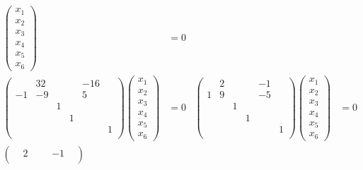 \documentclass[12pt,a4paper]{article}
\begin{document}
\begin{problem*}
\begin{enumerate}
\begin{align*}
                    \begin{pmatrix}
                        x_1\\x_2\\x_3\\x_4\\x_5\\x_6
                    \end{pmatrix}
                    &= 0\\
                    \begin{pmatrix}
                        & 32& & & -16& \\
                        -1& -9& & & 5& \\
                        & & 1& & & \\
                        & & & 1& & \\
                        & & & & & 1\\
                    \end{pmatrix}
                    \begin{pmatrix}
                        x_1\\x_2\\x_3\\x_4\\x_5\\x_6
                    \end{pmatrix}
                    &= 0&
                    \begin{pmatrix}
                        & 2& & & -1& \\
                        1& 9& & & -5& \\
                        & & 1& & & \\
                        & & & 1& & \\
                        & & & & & 1\\
                    \end{pmatrix}
                    \begin{pmatrix}
                        x_1\\x_2\\x_3\\x_4\\x_5\\x_6
                    \end{pmatrix}
                    &= 0\\
                    \begin{pmatrix}
                        & 2& & & -1& \\

\end{pmatrix}
\end{align*}
\end{enumerate}
\end{problem*}
\end{document}
